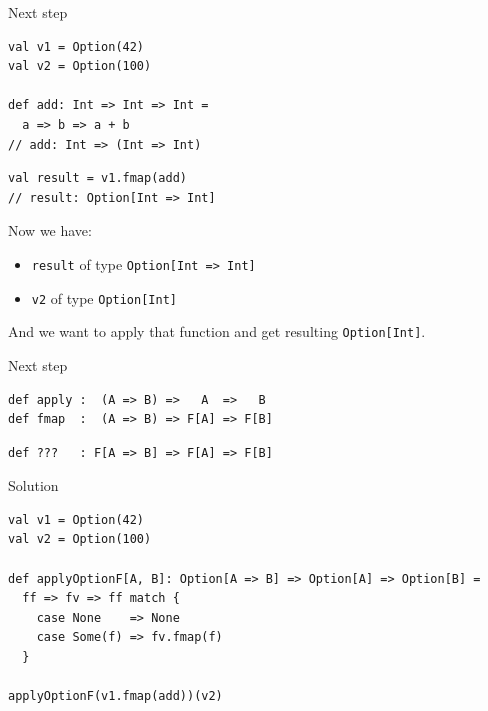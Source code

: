 \documentclass[presentation,aspectratio=169,smaller]{beamer}
\begin{document}
\begin{frame}[label={sec:orga75f671},fragile]{Next step}
 \begin{verbatim}
val v1 = Option(42)
val v2 = Option(100)

def add: Int => Int => Int =
  a => b => a + b
// add: Int => (Int => Int)
\end{verbatim}

\pause

\begin{verbatim}
val result = v1.fmap(add)
// result: Option[Int => Int]
\end{verbatim}

\pause

Now we have:

\begin{itemize}
\item \texttt{result} of type \texttt{Option[Int => Int]}
\item \texttt{v2} of type \texttt{Option[Int]}
\end{itemize}

And we want to apply that function and get resulting \texttt{Option[Int]}.
\end{frame}

\begin{frame}[label={sec:org9928251},fragile]{Next step}
 \begin{verbatim}
def apply :  (A => B) =>   A  =>   B
def fmap  :  (A => B) => F[A] => F[B]
\end{verbatim}

\pause

\begin{verbatim}
def ???   : F[A => B] => F[A] => F[B]
\end{verbatim}
\end{frame}

\begin{frame}[label={sec:org565b19b},fragile]{Solution}
 \begin{verbatim}
val v1 = Option(42)
val v2 = Option(100)

def applyOptionF[A, B]: Option[A => B] => Option[A] => Option[B] =
  ff => fv => ff match {
    case None    => None
    case Some(f) => fv.fmap(f)
  }

applyOptionF(v1.fmap(add))(v2)
\end{verbatim}
\end{frame}
\end{document}
